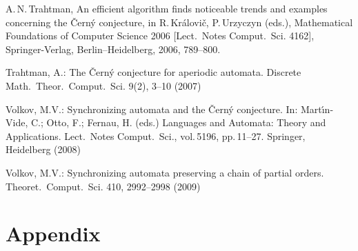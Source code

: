 \documentclass[11pt]{llncs}
\begin{document}
\begin{thebibliography}{99}
A.\,N.\,Trahtman, An efficient algorithm finds noticeable trends
and examples concerning the \v{C}ern\'y conjecture, in
R.\,Kr\'alovi\v{c}, P.\,Urzyczyn (eds.), Mathematical Foundations
of Computer Science 2006 [Lect.\ Notes Comput.\ Sci. 4162],
Springer-Verlag, Berlin--Heidelberg, 2006, 789--800.

Trahtman, A.: The \v{C}ern\'y conjecture for aperiodic automata.
Discrete Math.\ Theor.\ Comput.\ Sci. 9(2), 3--10 (2007)

Volkov, M.V.: Synchronizing automata and the \v{C}ern\'{y}
conjecture. In: Mart\'\i{}n-Vide, C.; Otto, F.; Fernau, H. (eds.)
Languages and Automata: Theory and Applications. Lect.\ Notes
Comput.\ Sci., vol.\,5196, pp.\,11--27.  Springer, Heidelberg (2008)

Volkov, M.V.: Synchronizing automata preserving a chain of partial
orders. Theoret.\ Comput.\ Sci. 410, 2992--2998 (2009)
\end{thebibliography}

\newpage
\section*{Appendix}
\end{document}

